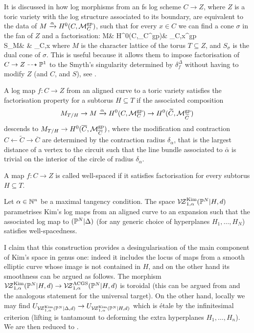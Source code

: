 It is discussed in \cite[Proposition 2.4.2.1]{RSPW2} how log morphisms from an fs log scheme $C\to Z$, where $Z$ is a toric variety with the log structure associated to its boundary, are equivalent to the data of $M\xrightarrow{\alpha} H^0(C,\mathcal M_C^{\rm{gp}})$, such that for every $x\in C$ we can find a cone $\sigma$ in the fan of $Z$ and a factorisation:
\bcd
M\ar[r] & H^0(C,\pM_C^{\rm{gp}})\ar[r] & \overline{\pM}_{C,x}^{\rm{gp}} \\
S_\sigma\cap M\ar[u,hook]\ar[rr,dashed] & & \overline{\pM}_{C,x}\ar[u,hook]
\ecd
where $M$ is the character lattice of the torus $T\subseteq Z$, and $S_\sigma$ is the dual cone of $\sigma$. This is useful because it allows them to impose factorisation of $C\rightarrow Z\dashrightarrow \mathbb P^1$ to the Smyth's singularity determined by $\delta_f^\Delta$ without having to modify $Z$ (and $C$, and $S$), see \cite[Definition 3.3.3]{RSPW2}.
\begin{dfn}
 A log map $f\colon C\to Z$ from an aligned curve to a toric variety satisfies the factorisation property for a subtorus $H\subseteq T$ if the associated composition \[M_{T/H}\rightarrow M\xrightarrow{\alpha} H^0(C,{\mathcal M}_C^{\rm{gp}})\rightarrow H^0(\widetilde{C},\mathcal M_{\widetilde{C}}^{\rm{gp}})\] descends to $M_{T/H}\rightarrow H^0(\overline{C},\mathcal M_{\overline{C}}^{\rm{gp}})$, where the modification and contraction $C\leftarrow \widetilde{C}\to \overline{C}$ are determined by the contraction radius $\delta_{\alpha}$, that is the largest distance of a vertex to the circuit such that the line bundle associated to $\bar\alpha$ is trivial on the interior of the circle of radius $\delta_\alpha$.
 
 A map $f\colon C\to Z$ is called well-spaced if it satisfies factorisation for every subtorus $H\subseteq T$.
\end{dfn}

\begin{dfn}
 Let $\alpha\in\mathbb{N}^n$ be a maximal tangency condition. The space $\mathcal{V\!Z}^{\rm{Kim}}_{1,\alpha}(\mathbb P^N|H,d)$ parametrises Kim's log maps from an aligned curve to an expansion such that the associated log map to $(\mathbb P^N|\Delta)$ (for any generic choice of hyperplanes $H_1,\ldots,H_N$) satisfies well-spacedness.
\end{dfn}

I claim that this construction provides a desingularisation of the main component of Kim's space in genus one: indeed it includes the locus of maps from a smooth elliptic curve whose image is not contained in $H$, and on the other hand its smoothness can be argued as follows. The morphism $\mathcal{V\!Z}^{\rm{Kim}}_{1,\alpha}(\mathbb P^N|H,d)\rightarrow \mathcal{V\!Z}^{\rm{ACGS}}_{1,\alpha}(\mathbb P^N|H,d)$ is toroidal (this can be argued from \cite[Lemma A and \S 4.3]{AbramovichMarcusWiseComparison} and the analogous statement for the universal target). On the other hand, locally we may find $U_{\mathcal{V\!Z}^{\rm{Kim}}_{1,\alpha}(\mathbb P^N|\Delta,d)}\rightarrow U_{\mathcal{V\!Z}^{\rm{Kim}}_{1,\alpha}(\mathbb P^N|H,d)}$ which is \'etale by the infinitesimal criterion (lifting is tantamount to deforming the extra hyperplanes $H_1,\ldots,H_n$). We are then reduced to \cite[Theorem 3.5.1]{RSPW2}.


